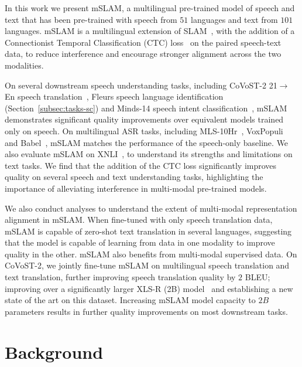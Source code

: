 \documentclass[nohyperref]{article}
\newcommand{\xlsrp}{XLS-R}
\newcommand{\xlsrpb}[1]{\xlsrp{} {(#1B)}}
\newcommand{\mslam}{mSLAM}
\begin{document}
In this work we present \mslam{}, a multilingual pre-trained model of speech and text that has been pre-trained with speech from $51$ languages and text from $101$ languages. \mslam{} is a multilingual extension of SLAM~\citep{bapna2021slam}, with the addition of a Connectionist Temporal Classification (CTC) loss~\citep{graves2006connectionist} on the paired speech-text data, to reduce interference and encourage stronger alignment across the two modalities.

On several downstream speech understanding tasks, including CoVoST-2 21$\rightarrow$En speech translation~\cite{wang2020covost},  Fleurs speech language identification (Section~\ref{subsec:tasks-sc}) and Minds-14 speech intent classification~\cite{gerz2021multilingual}, \mslam{} demonstrates significant quality improvements over equivalent models trained only on speech. On multilingual ASR tasks, including MLS-10Hr~\citep{pratap2020mls}, VoxPopuli~\citep{wang2021voxpopuli} and Babel~\citep{Gales2014SpeechRA}, \mslam{} matches the performance of the speech-only baseline. We also evaluate \mslam{} on XNLI~\cite{conneau2018xnli}, to understand its strengths and limitations on text tasks.
We find that the addition of the CTC loss significantly improves quality on several speech and text understanding tasks, highlighting the importance of alleviating interference in multi-modal pre-trained models.

We also conduct analyses to understand the extent of multi-modal representation alignment in \mslam{}. When fine-tuned with only speech translation data, \mslam{} is capable of zero-shot text translation in several languages, suggesting that the model is capable of learning from data in one modality to improve quality in the other. \mslam{} also benefits from multi-modal supervised data. On CoVoST-2, we jointly fine-tune \mslam{} on multilingual speech translation and text translation, further improving speech translation quality by $2$ BLEU; improving over a significantly larger \xlsrpb{2} model~\citep{babu2021xls} and establishing a new state of the art on this dataset. Increasing \mslam{} model capacity to $2B$ parameters results in further quality improvements on most downstream tasks.













\section{Background}
\label{sec:background}
\end{document}
